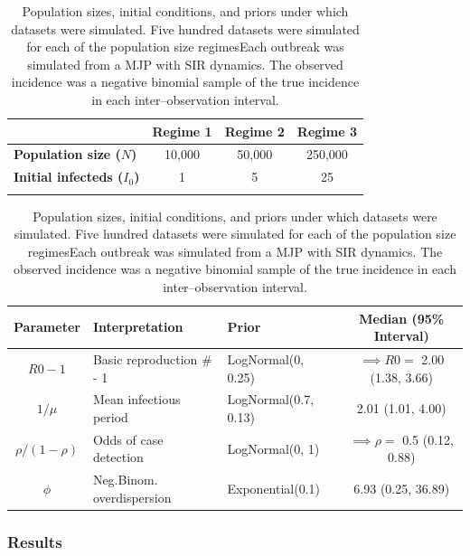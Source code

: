 \begin{table}[!ht]
	\label{tab:lna_coverage_sim}
	\caption{Population sizes, initial conditions, and priors under which datasets were simulated. Five hundred datasets were simulated for each of the population size regimesEach outbreak was simulated from a MJP with SIR dynamics. The observed incidence was a negative binomial sample of the true incidence in each inter--observation interval.}\small
	\centering
	\begin{tabular}{lccc}
		
		& \textbf{Regime 1} & \textbf{Regime 2} & \textbf{Regime 3} \\\hline
		\textbf{Population size ($ N $)} & 10,000 & 50,000 & 250,000 \\ 
		\textbf{Initial infecteds ($ I_0 $)} & 1 & 5 & 25 \\
		\hline
		&&&
	\end{tabular} 

	\begin{tabular}{cllc}
		\textbf{Parameter} & \textbf{Interpretation} & \textbf{Prior} & \textbf{Median (95\% Interval)} \\ \hline
		$ R0-1 $ & Basic reproduction \# - 1 & LogNormal(0, 0.25) & $ \implies R0 = $ 2.00 (1.38, 3.66) \\ 
		$ 1/\mu $ & Mean infectious period & LogNormal(0.7, 0.13)& 2.01 (1.01, 4.00) \\
		$ \rho / (1-\rho) $ & Odds of case detection & LogNormal(0, 1) & $ \implies \rho =$ 0.5 (0.12, 0.88) \\
		$ \phi $ & Neg.Binom. overdispersion & Exponential(0.1) & 6.93 (0.25, 36.89)\\
		\hline
	\end{tabular}
\end{table}

\subsubsection{Results}


